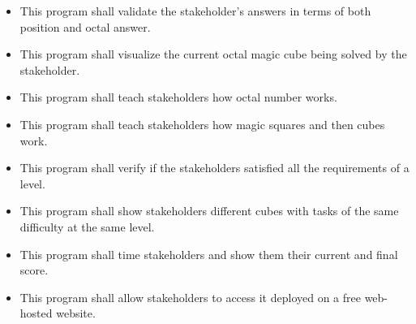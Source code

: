 \documentclass[12pt]{article}
\newcounter{srnum} %
\begin{document}
\noindent \begin{itemize}




\item[SR\refstepcounter{srnum}\thesrnum \label{MagicCubeValidator}] This program shall validate the stakeholder's answers in terms of both position and octal answer.

\item[SR\refstepcounter{srnum}\thesrnum \label{CubeVisualizer}] This program shall visualize the current octal magic cube being solved by the stakeholder.

\item[SR\refstepcounter{srnum}\thesrnum \label{OctalExplainer}] This program shall teach stakeholders how octal number works.

\item[SR\refstepcounter{srnum}\thesrnum \label{MagicCubeExplainer}] This program shall teach stakeholders how magic squares and then cubes work.

\item[SR\refstepcounter{srnum}\thesrnum \label{CompletionVerifier}] This program shall verify if the stakeholders satisfied all the requirements of a level.

\item[SR\refstepcounter{srnum}\thesrnum \label{LevelGenerator}] This program shall show stakeholders different cubes with tasks of the same difficulty at the same level.

\item[SR\refstepcounter{srnum}\thesrnum \label{ScoreKeeper}] This program shall time stakeholders and show them their current and final score.

\item[SR\refstepcounter{srnum}\thesrnum \label{BrowserDeployer}] This program shall allow stakeholders to access it deployed on a free web-hosted website.



\end{itemize}
\end{document}
